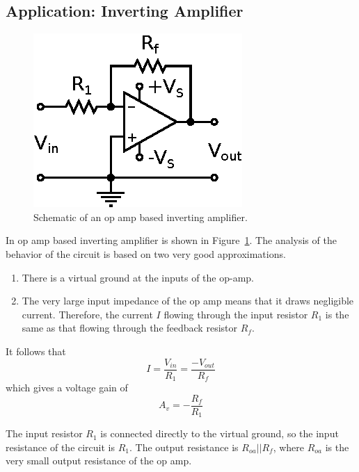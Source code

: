 \documentclass[11pt]{article}
\begin{document}
\subsection{Application: Inverting Amplifier}
\label{sec:invertingamp}

\begin{figure}[ht]
  \begin{center}
    \includegraphics{invertingamp.eps}
    \caption{Schematic of an op amp based inverting amplifier.}
    \label{fig:invertingamp}
  \end{center}
\end{figure}

In op amp based inverting amplifier is shown in
Figure~\ref{fig:invertingamp}. The analysis of the behavior of the
circuit is based on two very good approximations.
\begin{enumerate}
\item There is a virtual ground at the inputs of the op-amp.
  
\item The very large input impedance of the op amp means that it
  draws negligible current. Therefore, the current $I$ flowing through
  the input resistor $R_1$ is the same as that flowing through the
  feedback resistor $R_f$.
\end{enumerate}
It follows that
\begin{equation}
  I = \frac{V_{in}}{R_1} = \frac{-V_{out}}{R_f}
\end{equation}
which gives a voltage gain of
\begin{equation}
  A_v = -\frac{R_f}{R_1}
  \label{eq:invampgain}
\end{equation}

The input resistor $R_1$ is connected directly to the virtual ground,
so the input resistance of the circuit is $R_1$. The output resistance
is $R_{oa}||R_f$, where $R_{oa}$ is the very small output resistance
of the op amp.
\end{document}
